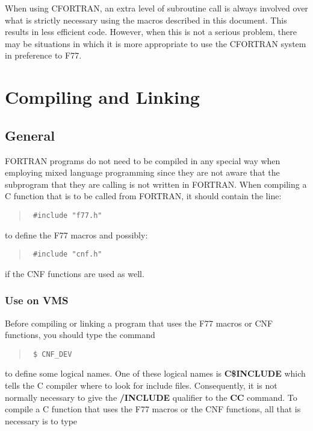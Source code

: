 When using CFORTRAN, an extra level of subroutine call is always involved over
what is strictly necessary using the macros described in this document. This
results in less efficient code. However, when this is not a serious problem,
there may be situations in which it is more appropriate to use the CFORTRAN
system in preference to F77.

\section{Compiling and Linking}
\label{compiling-and-linking}

\subsection{General}

FORTRAN programs do not need to be compiled in any special way when employing
mixed language programming since they are not aware that the subprogram that
they are calling is not written in FORTRAN. When compiling a C function that is
to be called from FORTRAN, it should contain the line:

\begin{quote}{\tt
\#include "f77.h"
}
\end{quote}

to define the F77 macros and possibly:

\begin{quote}{\tt
\#include "cnf.h"
}
\end{quote}

if the CNF functions are used as well.

\subsubsection{Use on VMS}

Before compiling or linking a program that uses the F77 macros or CNF
functions, you should type the command

\begin{quote}{\tt
\$ CNF\_DEV
}
\end{quote}

to define some logical names. One of these logical names is {\bf C\$INCLUDE}
which tells the C compiler where to look for include files. Consequently, it is
not normally necessary to give the {\bf /INCLUDE} qualifier to the {\bf CC}
command. To compile a C function that uses the F77 macros or the CNF functions,
all that is necessary is to type

